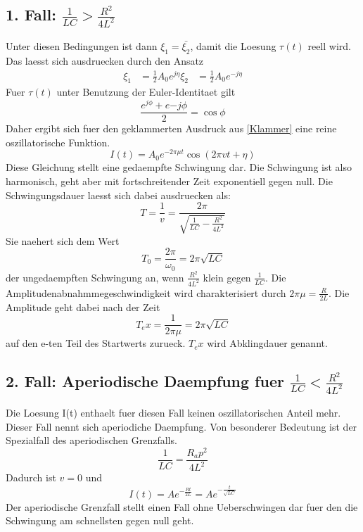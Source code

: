 \documentclass[titlepage=firstcover, captions=tableheading]{scrartcl}
\begin{document}
\subsection{1. Fall: $\frac{1}{LC}>\frac{R^2}{4L^2}$}
Unter diesen Bedingungen ist dann $\xi_1 =\bar{\xi_2}$, damit die Loesung $\tau(t)$ reell wird.
Das laesst sich ausdruecken durch den Ansatz
\begin{align}
    \xi_1&=\frac{1}{2}A_0e^{j\eta}\nonumber
    \xi_2&=\frac{1}{2}A_0e^{-j\eta}\nonumber
\end{align}
Fuer $\tau(t)$ unter Benutzung der Euler-Identitaet gilt
\begin{equation}
    \frac{e^{j\phi}+e{-j\phi}}{2}=\cos\phi \nonumber
\end{equation}
Daher ergibt sich fuer den geklammerten Ausdruck aus \ref{Klammer} eine reine oszillatorische Funktion.
\begin{equation}
    I(t)=A_0e^{-2\pi\mu t}\cos(2\pi vt+\eta)\nonumber
\end{equation}
Diese Gleichung stellt eine gedaempfte Schwingung dar. Die Schwingung ist also harmonisch, geht aber mit fortschreitender Zeit exponentiell gegen null. Die Schwingungsdauer laesst sich dabei ausdruecken als:
\begin{equation}
    T=\frac{1}{v}=\frac{2\pi}{\sqrt{\frac{1}{LC}-\frac{R^2}{4L^2}}}\nonumber
\end{equation}
Sie naehert sich dem Wert
\begin{equation}
    T_0=\frac{2\pi}{\omega_0}=2\pi\sqrt{LC}\nonumber
\end{equation}
der ungedaempften Schwingung an, wenn $\frac{R^2}{4L^2}$ klein gegen $\frac{1}{LC}$.
Die Amplitudenabnahmmegeschwindigkeit wird charakterisiert durch $2\pi\mu=\frac{R}{2L}$.
Die Amplitude geht dabei nach der Zeit 
\begin{equation}
    T_ex=\frac{1}{2\pi\mu}=2\pi\sqrt{LC}\nonumber
\end{equation}
auf den e-ten Teil des Startwerts zurueck. $T_ex$ wird Abklingdauer genannt.
\subsection{2. Fall: Aperiodische Daempfung fuer $\frac{1}{LC}<\frac{R^2}{4L^2}$}
Die Loesung I(t) enthaelt fuer diesen Fall keinen oszillatorischen Anteil mehr. Dieser Fall nennt sich aperiodiche Daempfung. Von besonderer Bedeutung ist der Spezialfall des aperiodischen Grenzfalls.
\begin{equation}
    \frac{1}{LC}=\frac{R_ap^2}{4L^2}\nonumber
\end{equation}
Dadurch ist $v=0$ und 
\begin{equation}
    I(t)=Ae^{-\frac{Rt}{2L}}=Ae^{-\frac{t}{\sqrt{LC}}}\nonumber
\end{equation} 
Der aperiodische Grenzfall stellt einen Fall ohne Ueberschwingen dar fuer den die Schwingung am schnellsten gegen null geht.
\end{document}
